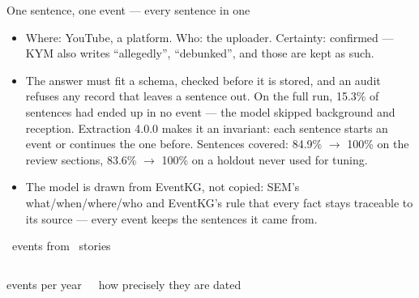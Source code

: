 \begin{frame}{One sentence, one event --- every sentence in one}
{\begin{itemize}
      the date's words; the pipeline copies the sentence from the page and parses the date. ``On
      May 7th'' has no year, so the year comes from the sentence before (April 2012); precision
      ``day''. ``Sometime in April 2012'' would be ``month''.
    \item Where: YouTube, a platform. Who: the uploader. Certainty: confirmed --- KYM also writes
      ``allegedly'', ``debunked'', and those are kept as such.
    \item The answer must fit a schema, checked before it is stored, and an audit refuses any
      record that leaves a sentence out. On the full run, 15.3\% of sentences had ended up in no
      event --- the model skipped background and reception. Extraction 4.0.0 makes it an
      invariant: each sentence starts an event or continues the one before. Sentences covered:
      84.9\% $\to$ 100\% on the review sections, 83.6\% $\to$ 100\% on a holdout never used for
      tuning.
    \item The model is drawn from EventKG, not copied: SEM's what/when/where/who and EventKG's rule
      that every fact stays traceable to its source --- every event keeps the sentences it came
      from.
  \end{itemize}}
\end{frame}

\begin{frame}{\NEvents\ events from \NSections\ stories}
  \begin{columns}[t]
      {\normalsize\color{gmInk2}events per year}\par\vskip1mm
      
      \par\vskip4mm
      {\normalsize\color{gmInk2}how precisely they are dated}\par\vskip1mm
      
  \end{columns}
\end{frame}
